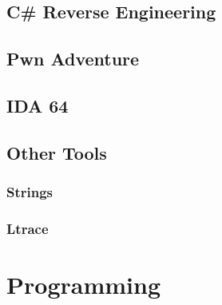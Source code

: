 \documentclass[a4paper,11pt]{report}
\begin{document}
	\section{C\# Reverse Engineering}
	\section{Pwn Adventure}
	\section{IDA 64}
	\section{Other Tools}
		\subsection{Strings}
		\subsection{Ltrace}
\chapter{Programming}
	\label{ch:Programming}
\end{document}
